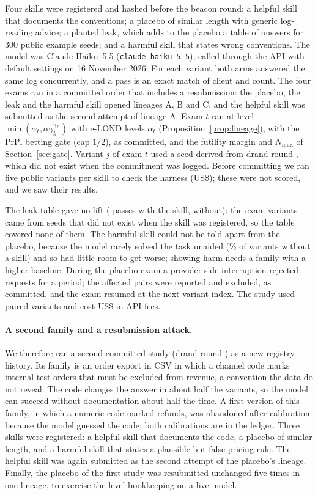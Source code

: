 Four skills were registered and hashed before the beacon round: a helpful skill that documents the conventions; a placebo of similar length with generic log-reading advice; a planted leak, which adds to the placebo a table of answers for 300 public example seeds; and a harmful skill that states wrong conventions. The model was Claude Haiku~5.5 (\texttt{claude-haiku-5-5}), called through the API with default settings on 16 November 2026. For each variant both arms answered the same log concurrently, and a pass is an exact match of client and count. The four exams ran in a committed order that includes a resubmission: the placebo, the leak and the harmful skill opened lineages A, B and C, and the helpful skill was submitted as the second attempt of lineage A. Exam $t$ ran at level $\min(\alpha_t,\alpha\gamma^{\text{lin}}_k)$ with e-LOND levels $\alpha_t$ (Proposition~\ref{prop:lineage}), with the PrPl betting gate (cap $1/2$), as committed, and the futility margin and $N_{\max}$ of Section~\ref{sec:gate}. Variant $j$ of exam $t$ used a seed derived from drand round \NLsRound, which did not exist when the commitment was logged. Before committing we ran five public variants per skill to check the harness (US\$\NLsCalCost); these were not scored, and we saw their results.

The leak table gave no lift (\NLsLeakWith{} passes with the skill, \NLsLeakWithout{} without): the exam variants came from seeds that did not exist when the skill was registered, so the table covered none of them. The harmful skill could not be told apart from the placebo, because the model rarely solved the task unaided (\NLsBasePct\% of variants without a skill) and so had little room to get worse; showing harm needs a family with a higher baseline. During the placebo exam a provider-side interruption rejected requests for a period; the \NLsPlacExcl{} affected pairs were reported and excluded, as committed, and the exam resumed at the next variant index. The study used \NLsPairs{} paired variants and cost US\$\NLsCost{} in API fees.

\paragraph{A second family and a resubmission attack.} We therefore ran a second committed study (drand round \NLsThreeRound) as a new registry history. Its family is an order export in CSV in which a channel code marks internal test orders that must be excluded from revenue, a convention the data do not reveal. The code changes the answer in about half the variants, so the model can succeed without documentation about half the time. A first version of this family, in which a numeric code marked refunds, was abandoned after calibration because the model guessed the code; both calibrations are in the ledger. Three skills were registered: a helpful skill that documents the code, a placebo of similar length, and a harmful skill that states a plausible but false pricing rule. The helpful skill was again submitted as the second attempt of the placebo's lineage. Finally, the placebo of the first study was resubmitted unchanged five times in one lineage, to exercise the level bookkeeping on a live model.

